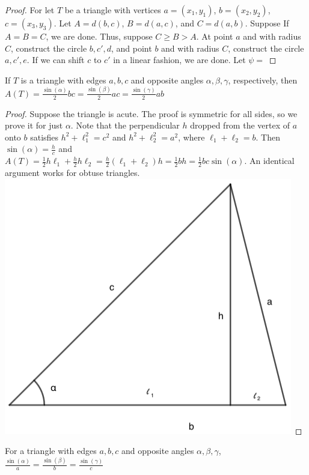 \documentclass[crop=false,class=book,oneside]{standalone}
\begin{document}
            \begin{proof}
            For let $T$ be a triangle with vertices $a=(x_1,y_1)$, $b=(x_2,y_2)$, $c=(x_3,y_3)$. Let $A = d(b,c)$, $B=d(a,c)$, and $C=d(a,b)$. Suppose If $A=B=C$, we are done. Thus, suppose $C\geq B >A$. At point $a$ and with radius $C$, construct the circle $b,c',d$, and point $b$ and with radius $C$, construct the circle $a,c',e$. If we can shift $c$ to $c'$ in a linear fashion, we are done. Let $\psi =$
            \end{proof}
            \begin{theorem}
            If $T$ is a triangle with edges $a,b,c$ and opposite angles $\alpha,\beta,\gamma$, respectively, then $A(T) = \frac{\sin(\alpha)}{2}bc = \frac{\sin(\beta)}{2}ac = \frac{\sin(\gamma)}{2}ab$
            \end{theorem}
            \begin{proof}
            Suppose the triangle is acute. The proof is symmetric for all sides, so we prove it for just $\alpha$. Note that the perpendicular $h$ dropped from the vertex of $a$ onto $b$ satisfies $h^2+\ell_1^2 = c^2$ and $h^2+\ell_2^2 = a^2$, where $\ell_1+\ell_2 = b$. Then $\sin(\alpha) = \frac{h}{c}$ and $A(T) = \frac{1}{2}h\ell_1 + \frac{h}{2}h\ell_2 = \frac{h}{2}(\ell_1+\ell_2)h = \frac{1}{2}bh = \frac{1}{2}bc\sin(\alpha)$. An identical argument works for obtuse triangles.
            \includegraphics[scale=0.3]{triangle-1.png}
            \end{proof}
            \begin{corollary}
            For a triangle with edges $a,b,c$ and opposite angles $\alpha,\beta,\gamma$, $\frac{\sin(\alpha)}{a} = \frac{\sin(\beta)}{b} = \frac{\sin(\gamma)}{c}$
            \end{corollary}
\end{document}
